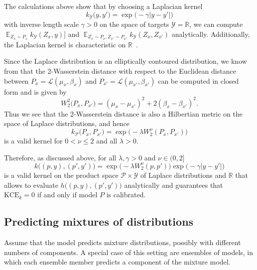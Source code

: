 \documentclass{article}
\DeclareMathOperator{\Exp}{\mathbb{E}}
\begin{document}
The calculations above show that by choosing a Laplacian
kernel
\begin{equation*}
    k_{\mathcal{Y}}\big(y, y'\big) = \exp{\big(-\gamma |y-y'|\big)}
\end{equation*}
with inverse length scale $\gamma > 0$ on the space of targets
$\mathcal{Y} = \mathbb{R}$, we can compute
$\Exp_{Z_x \sim P_x} k_{\mathcal{Y}}(Z_x, y)]$ and
$\Exp_{Z_x \sim P_x, Z_{x'} \sim P_{x'}} k_{\mathcal{Y}}(Z_x, Z_{x'})$
analytically. Additionally, the Laplacian kernel is characteristic
on $\mathbb{R}$~\citep{Fukumizu2008}.

Since the Laplace distribution is an elliptically contoured
distribution, we know from \cite[Corollary~2]{Gelbrich1990} that
the 2-Wasserstein distance with respect to the Euclidean distance between
$P_x = \mathcal{L}(\mu_x, \beta_x)$ and
$P_{x'} = \mathcal{L}(\mu_{x'}, \beta_{x'})$ can be
computed in closed form and is given by
\begin{equation*}
    W^2_2\big(P_x, P_{x'}\big) = {(\mu_x - \mu_{x'})}^2 + 2{(\beta_x - \beta_{x'})}^2.
\end{equation*}
Thus we see that the 2-Wasserstein distance is also a Hilbertian metric
on the space of Laplace distributions, and hence
\begin{equation*}
    k_{\mathcal{P}}\big(P_x, P_{x'}\big) = \exp{\big(- \lambda W_2^\nu(P_x, P_{x'})\big)}
\end{equation*}
is a valid kernel for $0 < \nu \leq 2$ and all $\lambda > 0$.

Therefore, as discussed above, for all $\lambda, \gamma > 0$ and $\nu \in (0, 2]$
\begin{equation*}
    k\big((p, y), (p', y')\big) = \exp{\big(-\lambda W^\nu_2(p, p')\big)} \exp{\big(-\gamma |y-y'|\big)}
\end{equation*}
is a valid kernel on the product space $\mathcal{P} \times \mathcal{Y}$
of Laplace distributions and $\mathbb{R}$ that allows to evaluate
$h\big((p, y), (p', y')\big)$ analytically and guarantees that $\mathrm{KCE}_k = 0$
if and only if model $P$ is calibrated.

\subsection{Predicting mixtures of distributions}
\label{app:mixture}

Assume that the model predicts mixture distributions, possibly with different
numbers of components. A special case of this setting are ensembles of models,
in which each ensemble member predicts a component of the mixture model.
\end{document}
